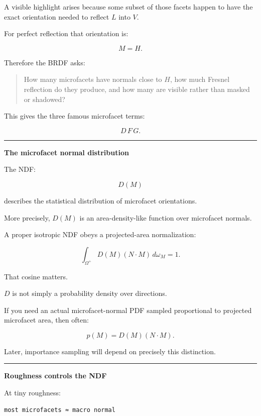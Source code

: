 A visible highlight arises because some subset of those facets happen to have the exact orientation needed to reflect \(L\) into \(V\).

For perfect reflection that orientation is:

\[
M=H.
\]

Therefore the BRDF asks:

\begin{quote}
How many microfacets have normals close to \(H\), how much Fresnel reflection do they produce, and how many are visible rather than masked or shadowed?
\end{quote}

This gives the three famous microfacet terms:

\[
\boxed{
D\,F\,G.
}
\]

\begin{center}\rule{0.5\linewidth}{0.5pt}\end{center}

\textbf{The microfacet normal distribution}

The NDF:

\[
D(M)
\]

describes the statistical distribution of microfacet orientations.

More precisely, \(D(M)\) is an area-density-like function over microfacet normals.

A proper isotropic NDF obeys a projected-area normalization:

\[
\boxed{
\int_{\Omega^+}
D(M)(N\cdot M)
\,d\omega_M
=
1.
}
\]

That cosine matters.

\(D\) is not simply a probability density over directions.

If you need an actual microfacet-normal PDF sampled proportional to projected microfacet area, then often:

\[
p(M)=D(M)(N\cdot M).
\]

Later, importance sampling will depend on precisely this distinction.

\begin{center}\rule{0.5\linewidth}{0.5pt}\end{center}

\textbf{Roughness controls the NDF}

At tiny roughness:

\begin{verbatim}
most microfacets ≈ macro normal
\end{verbatim}

